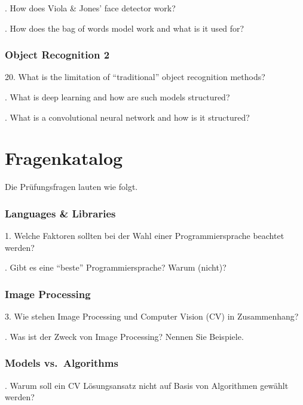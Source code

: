 \documentclass[paper=A4,11pt]{scrartcl}
\begin{document}
\bigskip{}. How does Viola \& Jones' face detector work?

\bigskip{}. How does the bag of words model work and what is it used for?


\subsubsection*{Object Recognition 2} %

20. What is the limitation of \enquote{traditional} object recognition methods?

\bigskip{}. What is deep learning and how are such models structured?

\bigskip{}. What is a convolutional neural network and how is it structured?



\section{Fragenkatalog} %
\label{sec:fragenkatalog}

Die Prüfungsfragen lauten wie folgt.

\subsubsection*{Languages \& Libraries} %

1. Welche Faktoren sollten bei der Wahl einer Programmiersprache beachtet werden?

\bigskip{}. Gibt es eine \enquote{beste} Programmiersprache? Warum (nicht)?


\subsubsection*{Image Processing} %

3. Wie stehen Image Processing und Computer Vision (CV) in Zusammenhang?

\bigskip{}. Was ist der Zweck von Image Processing? Nennen Sie Beispiele.


\subsubsection*{Models vs.\ Algorithms} %

\bigskip{}. Warum soll ein CV Lösungsansatz nicht auf Basis von Algorithmen gewählt werden?
\end{document}
